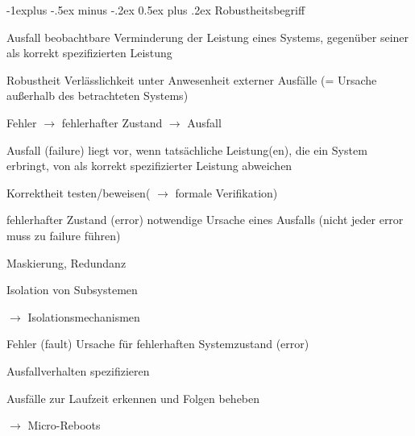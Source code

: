 \documentclass[a4paper]{article}
\makeatletter
\renewcommand{\subsection}{\@startsection{subsection}{2}{0mm}%
 {-1explus -.5ex minus -.2ex}%
 {0.5ex plus .2ex}%
 {\normalfont\normalsize\bfseries}}
\makeatother
\begin{document}
\begin{multicols}{3}
    \subsection{Robustheitsbegriff}
    \begin{description*}
        \item[Ausfall] beobachtbare Verminderung der Leistung eines Systems, gegenüber seiner als korrekt spezifizierten Leistung
        \item[Robustheit] Verlässlichkeit unter Anwesenheit externer Ausfälle (= Ursache außerhalb des betrachteten Systems)
    \end{description*}
    \begin{itemize*}
        \item Fehler $\rightarrow$ fehlerhafter Zustand $\rightarrow$ Ausfall
    \end{itemize*}
    \begin{description*}
        \item[Ausfall] (failure) liegt vor, wenn tatsächliche Leistung(en), die ein System erbringt, von als korrekt spezifizierter Leistung abweichen
        \begin{itemize*}
            \item Korrektheit testen/beweisen( $\rightarrow$ formale Verifikation)
        \end{itemize*}
        \item[fehlerhafter Zustand] (error) notwendige Ursache eines Ausfalls (nicht jeder error muss zu failure führen)
        \begin{itemize*}
            \item Maskierung, Redundanz
            \item Isolation von Subsystemen
            \item[$\rightarrow$] Isolationsmechanismen
        \end{itemize*}
        \item[Fehler] (fault) Ursache für fehlerhaften Systemzustand (error)%
        \begin{itemize*}
            \item Ausfallverhalten spezifizieren
            \item Ausfälle zur Laufzeit erkennen und Folgen beheben%
            \item[$\rightarrow$] Micro-Reboots
        \end{itemize*}
    \end{description*}


\end{multicols}
\end{document}
